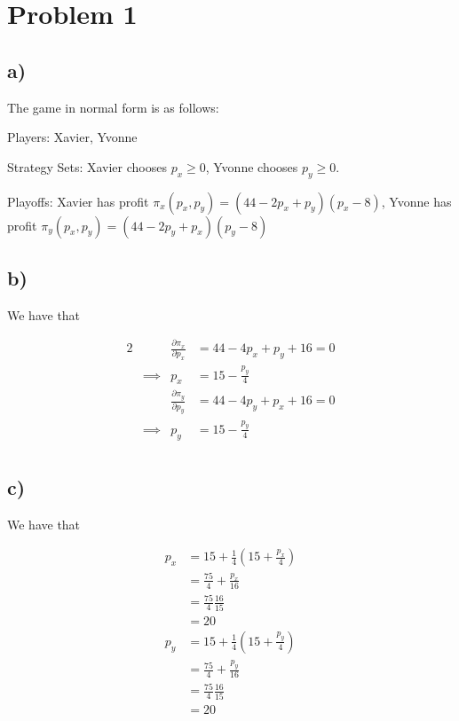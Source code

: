 \documentclass[12pt,letterpaper]{article}
\theoremstyle{definition}
\begin{document}
\section*{Problem 1}

\subsection*{a)}

The game in normal form is as follows:

Players: Xavier, Yvonne

Strategy Sets: Xavier chooses $p_x \geq 0$, Yvonne chooses $p_y \geq 0$.

Playoffs: Xavier has profit $\pi_x(p_x,p_y) = (44 - 2p_x + p_y)(p_x - 8)$,
Yvonne has profit $\pi_y(p_x, p_y) = (44 - 2p_y + p_x)(p_y - 8)$

\subsection*{b)}

We have that

\begin{alignat*}{2}
  && \frac{\partial \pi_x}{\partial p_x} &= 44 - 4p_x + p_y + 16 = 0 \\
  &\implies& p_x &= 15 - \frac{p_y}{4} \\
  && \frac{\partial \pi_y}{\partial p_y} &= 44 - 4p_y + p_x + 16 = 0 \\
  &\implies& p_y &= 15 - \frac{p_y}{4} \\
\end{alignat*}

\subsection*{c)}

We have that

\begin{align*}
  p_x &= 15 + \frac{1}{4}(15 + \frac{p_x}{4} ) \\
      &= \frac{75}{4} + \frac{p_x}{16} \\
      &= \frac{75}{4}\frac{16}{15} \\
      &= 20 \\
  p_y &= 15 + \frac{1}{4}(15 + \frac{p_y}{4} ) \\
      &= \frac{75}{4} + \frac{p_y}{16} \\
      &= \frac{75}{4}\frac{16}{15} \\
      &= 20 \\
\end{align*}
\end{document}
